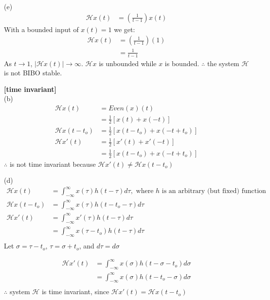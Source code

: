 \documentclass{article}
\begin{document}
(e)
\begin{equation*}
\begin{split}
    \mathcal{H}x(t) &= (\frac{1}{t - 1})x(t)
\end{split}
\end{equation*}
With a bounded input of $x(t) = 1$ we get:
\begin{equation*}
\begin{split}
    \mathcal{H}x(t) &= (\frac{1}{t - 1})(1)\\
    &= \frac{1}{t - 1}
\end{split}
\end{equation*}
As $t \rightarrow 1$, $|\mathcal{H}x(t)| \rightarrow \infty$. $\mathcal{H}x$ is unbounded while $x$ is bounded. $\therefore$ the system $\mathcal{H}$ is not BIBO stable.


 {\bf [time invariant]}\\
(b)
\begin{equation*}
\begin{split}
    \mathcal{H}x(t) &= Even(x)(t)\\
    &= \frac{1}{2}[x(t) + x(-t)]\\
    \mathcal{H}x(t - t_o) &= \frac{1}{2}[x(t - t_o) + x(-t + t_o)]\\
    \mathcal{H}x'(t) &= \frac{1}{2}[x'(t) + x'(-t)]\\
    &=\frac{1}{2}[x(t - t_o) + x(-t + t_o)]
\end{split}
\end{equation*}
$\therefore$ is not time invariant because $\mathcal{H}x'(t) \neq \mathcal{H}x(t - t_o)$

(d)
\begin{equation*}
\begin{split}
    \mathcal{H}x(t) &= \int_{-\infty}^{\infty} x (\tau) h (t - \tau) d\tau, \text{ where $h$ is an arbitrary (but fixed) function}\\
    \mathcal{H}x(t - t_o) &= \int_{-\infty}^{\infty} x(\tau) h (t - t_o - \tau)d\tau\\
    \mathcal{H}x'(t) &= \int_{-\infty}^{\infty} x'(\tau) h (t - \tau) d\tau\\
    &= \int_{-\infty}^{\infty} x(\tau - t_o) h (t - \tau) d\tau\\
\end{split}
\end{equation*}
Let $\sigma = \tau - t_o$, $\tau = \sigma + t_o$, and $d\tau = d\sigma$

\begin{equation*}
\begin{split}
    \mathcal{H}x'(t) &= \int_{-\infty}^{\infty} x(\sigma) h (t - \sigma - t_o) d \sigma\\
    &= \int_{-\infty}^{\infty} x(\sigma) h (t - t_o - \sigma) d \sigma\\
\end{split}
\end{equation*}
$\therefore$ system $\mathcal{H}$ is time invariant, since $\mathcal{H}x'(t) = \mathcal{H}x(t - t_o)$ 
\end{document}
